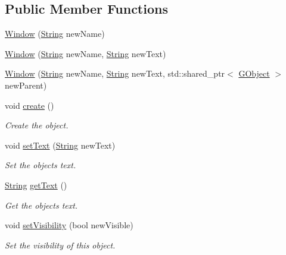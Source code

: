 \subsection*{Public Member Functions}
\begin{DoxyCompactItemize}
\item 
\hyperlink{class_rad_j_a_v_1_1_g_u_i_1_1_window_afe6c5fda53deb03924a3587fdf0a2f21}{Window} (\hyperlink{class_rad_j_a_v_1_1_string}{String} new\+Name)
\item 
\hyperlink{class_rad_j_a_v_1_1_g_u_i_1_1_window_a0ff0dc6d9051251bf5a82f8bd6b7ede1}{Window} (\hyperlink{class_rad_j_a_v_1_1_string}{String} new\+Name, \hyperlink{class_rad_j_a_v_1_1_string}{String} new\+Text)
\item 
\hyperlink{class_rad_j_a_v_1_1_g_u_i_1_1_window_a91fa44be744ead01b131f5e81f14cb7f}{Window} (\hyperlink{class_rad_j_a_v_1_1_string}{String} new\+Name, \hyperlink{class_rad_j_a_v_1_1_string}{String} new\+Text, std\+::shared\+\_\+ptr$<$ \hyperlink{class_rad_j_a_v_1_1_g_u_i_1_1_g_object}{G\+Object} $>$ new\+Parent)
\item 
void \hyperlink{class_rad_j_a_v_1_1_g_u_i_1_1_window_a92bf59c30dd5b9f77d77a31f9a2f8982}{create} ()
\begin{DoxyCompactList}\small\item\em Create the object. \end{DoxyCompactList}\item 
void \hyperlink{class_rad_j_a_v_1_1_g_u_i_1_1_window_acbc9c4caf87c4922bafa4b89dc2a9c03}{set\+Text} (\hyperlink{class_rad_j_a_v_1_1_string}{String} new\+Text)
\begin{DoxyCompactList}\small\item\em Set the object\textquotesingle{}s text. \end{DoxyCompactList}\item 
\hyperlink{class_rad_j_a_v_1_1_string}{String} \hyperlink{class_rad_j_a_v_1_1_g_u_i_1_1_window_a91a0cb7a172dc0ff1e378706b033cf3d}{get\+Text} ()
\begin{DoxyCompactList}\small\item\em Get the object\textquotesingle{}s text. \end{DoxyCompactList}\item 
void \hyperlink{class_rad_j_a_v_1_1_g_u_i_1_1_window_a7e92748e13733aa6c2b15beaaa76ab55}{set\+Visibility} (bool new\+Visible)
\begin{DoxyCompactList}\small\item\em Set the visibility of this object. \end{DoxyCompactList}\item 

\end{DoxyCompactItemize}
